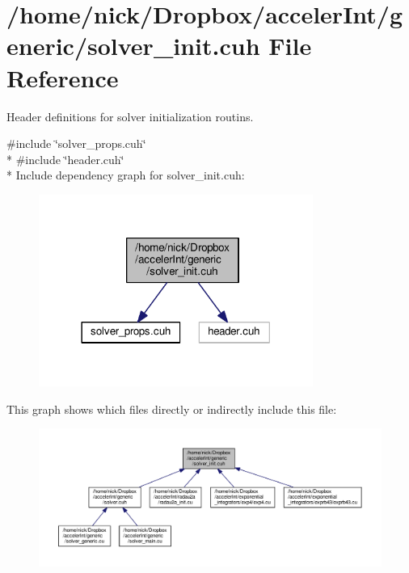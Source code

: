 \hypertarget{solver__init_8cuh}{}\section{/home/nick/\+Dropbox/acceler\+Int/generic/solver\+\_\+init.cuh File Reference}
\label{solver__init_8cuh}


Header definitions for solver initialization routins.  


{\ttfamily \#include \char`\"{}solver\+\_\+props.\+cuh\char`\"{}}\\*
{\ttfamily \#include \char`\"{}header.\+cuh\char`\"{}}\\*
Include dependency graph for solver\+\_\+init.\+cuh\+:
\nopagebreak
\begin{figure}[H]
\begin{center}
\leavevmode
\includegraphics[width=254pt]{solver__init_8cuh__incl}
\end{center}
\end{figure}
This graph shows which files directly or indirectly include this file\+:
\nopagebreak
\begin{figure}[H]
\begin{center}
\leavevmode
\includegraphics[width=350pt]{solver__init_8cuh__dep__incl}
\end{center}
\end{figure}
